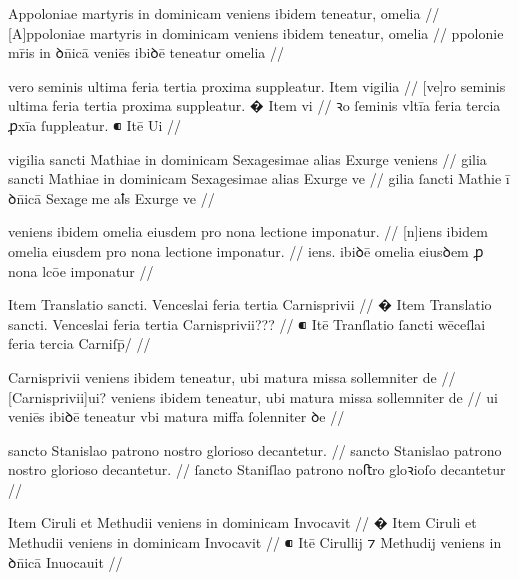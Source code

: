 \ex \bg
 \gla
{}
Appoloniae martyris in dominicam  veniens ibidem teneatur,
omelia
//
\glRekonstrukcja
{}
[A]ppoloniae martyris in dominicam  veniens ibidem teneatur,
omelia
//
\glU
{}
ppolonie mr̄is in ꝺn̄icā  veniēs ibiꝺē teneatur omelia
//
\endgl
\eg



\ex \bg
\gla
{}
vero seminis ultima feria tertia proxima suppleatur.
{} Item vigilia
//
\glRekonstrukcja
{}
[ve]ro seminis ultima feria tertia proxima suppleatur.
� Item vi
//
\glU
{}
ꝛo ſeminis vltīa feria tercia ꝓxīa ſuppleatur. ⁌ Itē Ui
//
\endgl
\eg



\ex \bg
\gla
{}
vigilia sancti Mathiae in dominicam Sexagesimae alias Exurge
veniens
//
\glRekonstrukcja
{}
gilia sancti Mathiae in dominicam Sexagesimae alias Exurge
ve
//
\glU
{}
gilia ſancti Mathie ī ꝺn̄icā Sexageme aꝉs Exurge ve
//
\endgl
\eg



\ex \bg
\gla
{}
veniens ibidem omelia eiusdem pro nona lectione imponatur.
//
\glRekonstrukcja
{}
[n]iens ibidem omelia eiusdem pro nona lectione imponatur.
//
\glU
{}
iens. ibiꝺē omelia eiusꝺem ꝓ nona lcōe imponatur
//
\endgl
\eg



\ex \bg
\gla
{} {} Item Translatio sancti. Venceslai feria tertia Carnisprivii
//
\glRekonstrukcja
{}
� Item Translatio sancti. Venceslai feria tertia Carnisprivii???
//
\glU
{}
⁌ Itē Tranſlatio ſancti wēceſlai feria tercia Carniſp̄/
//
\endgl
\eg



\ex \bg
\gla
{}
Carnisprivii veniens
ibidem teneatur, ubi matura missa sollemniter de
//
\glRekonstrukcja
{}
[Carnisprivii]ui? veniens
ibidem teneatur, ubi matura missa sollemniter de
//
\glU
{}
ui veniēs ibiꝺē teneatur vbi matura miﬀa ſolenniter ꝺe
//
\endgl
\eg



\ex \bg
\gla
{}
sancto Stanislao patrono nostro glorioso decantetur.
//
\glRekonstrukcja
{}
sancto Stanislao patrono nostro glorioso decantetur.
//
\glU
{}
ſancto Staniſlao patrono noﬅro gloꝛioſo decantetur
//
\endgl
\eg



\ex \bg
\gla
{}
{} Item Ciruli et Methudii veniens in dominicam Invocavit
//
\glRekonstrukcja
{}
� Item Ciruli et Methudii veniens in dominicam Invocavit
//
\glU
{}
⁌ Itē Cirullij ⁊ Methudij veniens in ꝺn̄icā Inuocauit
//
\endgl
\eg



